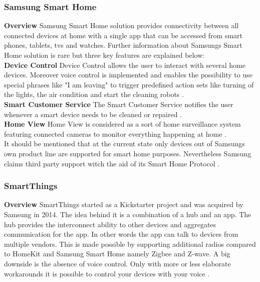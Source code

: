 				\pagebreak
 
		\subsubsection{Samsung Smart Home}
			\textbf{Overview}
				Samsung Smart Home solution provides connectivity between all connected devices at home with a single app that can be accessed from smart phones, tablets, tvs and watches. Further information about Samsungs Smart Home solution is rare but three key features are explained below:\\

			\textbf{Device Control}
				Device Control allows the user to interact with several home devices. Moreover voice control is implemented and enables the possibility to use special phrases like "I am leaving" to trigger predefined action sets like turning of the lights, the air condition and start the cleaning robots \parencite{SHP}.\\

			\textbf{Smart Customer Service}
				The Smart Customer Service notifies the user whenever a smart device needs to be cleaned or repaired \parencite{SHP}.\\

			\textbf{Home View}
				Home View is considered as a sort of home surveillance system featuring connected cameras to monitor everything happening at home \parencite{SHP}.\\

			It should be mentioned that at the current state only devices out of Samsungs own product line are supported for smart home purposes. Nevertheless Samsung claims third party support witch the aid of its Smart Home Protocol \parencite{SHP}.


		\subsubsection{SmartThings}
			\textbf{Overview}
				SmartThings started as a Kickstarter project and was acquired by Samsung in 2014. The idea behind it is a combination of a hub and an app. The hub provides the interconnect ability to other devices and aggregates communication for the app. In other words the app can talk to devices from multiple vendors. This is made possible by supporting additional radios compared to HomeKit and Samsung Smart Home namely Zigbee and Z-wave. A big downside is the absence of voice control. Only with more or less elaborate workarounds it is possible to control your devices with your voice \parencite{SmartThingsKick}.

